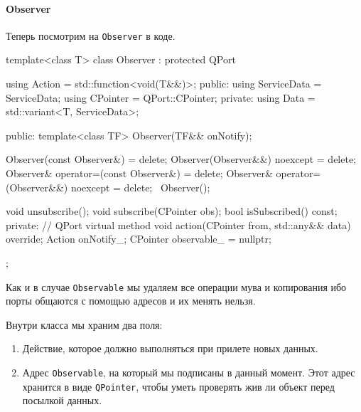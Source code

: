 \paragraph{Observer}

Теперь посмотрим на \verb"Observer" в коде.
\begin{cppcode}
template<class T>
class Observer : protected QPort {
  using Action = std::function<void(T&&)>;
public:
  using ServiceData = ServiceData;
  using CPointer = QPort::CPointer;
private:
  using Data = std::variant<T, ServiceData>;

public:
  template<class TF>
  Observer(TF&& onNotify);
  
  Observer(const Observer&) = delete;
  Observer(Observer&&) noexcept = delete;
  Observer& operator=(const Observer&) = delete;
  Observer& operator=(Observer&&) noexcept = delete;
  ~Observer();
  
  void unsubscribe();
  void subscribe(CPointer obs);
  bool isSubscribed() const;
private:
  // QPort virtual method
  void action(CPointer from, std::any&& data) override;
  Action onNotify_;
  CPointer observable_ = nullptr;
};
\end{cppcode}
Как и в случае \verb"Observable" мы удаляем все операции мува и копирования ибо порты общаются с помощью адресов и их менять нельзя.

Внутри класса мы храним два поля:
\begin{enumerate}
\item Действие, которое должно выполняться при прилете новых данных.

\item Адрес \verb"Observable", на который мы подписаны в данный момент.
Этот адрес хранится в виде \verb"QPointer", чтобы уметь проверять жив ли объект перед посылкой данных.
\end{enumerate}

